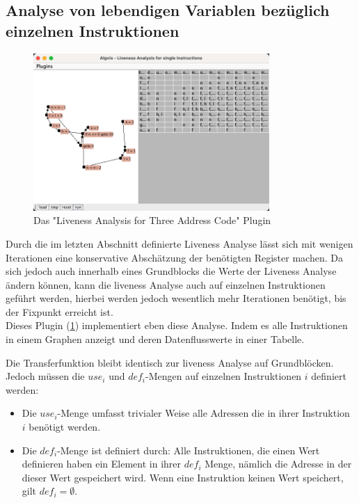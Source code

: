 \subsection{Analyse von lebendigen Variablen bezüglich einzelnen Instruktionen}
\begin{figure}[h]
  \centering
  \includegraphics[width=0.8\textwidth]{fig/Screenshot_LivenesTAC.png}
  \caption{Das "Liveness Analysis for Three Address Code" Plugin}
  \label{fig:livenessAnalysisTAC}
\end{figure}
Durch die im letzten Abschnitt definierte Liveness Analyse lässt sich mit wenigen
Iterationen eine konservative Abschätzung der benötigten Register machen.
Da sich jedoch auch innerhalb eines Grundblocks die Werte der Liveness Analyse ändern können,
kann die liveness Analyse auch auf einzelnen Instruktionen geführt werden, 
hierbei werden jedoch wesentlich mehr Iterationen benötigt, bis der Fixpunkt erreicht ist.\\

Dieses Plugin (\cref{fig:livenessAnalysisTAC}) implementiert eben diese Analyse. Indem es alle Instruktionen
in einem Graphen anzeigt und deren Datenflusswerte in einer Tabelle.

Die Transferfunktion bleibt identisch zur liveness Analyse auf Grundblöcken.
Jedoch müssen die $use_i$ und $def_i$-Mengen auf einzelnen Instruktionen $i$
definiert werden:
\begin{itemize}
  \item Die $use_i$-Menge umfasst trivialer Weise alle Adressen die in ihrer Instruktion $i$
    benötigt werden.
  \item Die $def_i$-Menge ist definiert durch: 
    Alle Instruktionen, die einen Wert definieren haben ein Element in ihrer
    $def_i$ Menge, nämlich die Adresse in der dieser Wert gespeichert wird.
    Wenn eine Instruktion keinen Wert speichert, gilt $def_i=\emptyset$.
\end{itemize}
